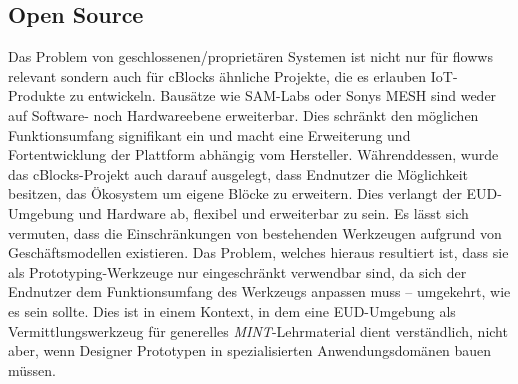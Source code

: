 \subsection{Open Source}
Das Problem von geschlossenen/proprietären Systemen ist nicht nur für flowws relevant sondern auch für cBlocks ähnliche Projekte, die es erlauben \ac{IoT}-Produkte zu entwickeln. Bausätze wie SAM-Labs oder Sonys MESH sind weder auf Software- noch Hardwareebene erweiterbar. Dies schränkt den möglichen Funktionsumfang signifikant ein und macht eine Erweiterung und Fortentwicklung der Plattform abhängig vom Hersteller. Währenddessen, wurde das cBlocks-Projekt auch darauf ausgelegt, dass Endnutzer die Möglichkeit besitzen, das Ökosystem um eigene Blöcke zu erweitern. Dies verlangt der \ac{EUD}-Umgebung und Hardware ab, flexibel und erweiterbar zu sein. Es lässt sich vermuten, dass die Einschränkungen von bestehenden Werkzeugen aufgrund von Geschäftsmodellen existieren. Das Problem, welches hieraus resultiert ist, dass sie als Prototyping-Werkzeuge nur eingeschränkt verwendbar sind, da sich der Endnutzer dem Funktionsumfang des Werkzeugs anpassen muss -- umgekehrt, wie es sein sollte. Dies ist in einem Kontext, in dem eine \ac{EUD}-Umgebung als Vermittlungswerkzeug für generelles \textit{MINT}-Lehrmaterial dient verständlich, nicht aber, wenn Designer Prototypen in spezialisierten Anwendungsdomänen bauen müssen.
